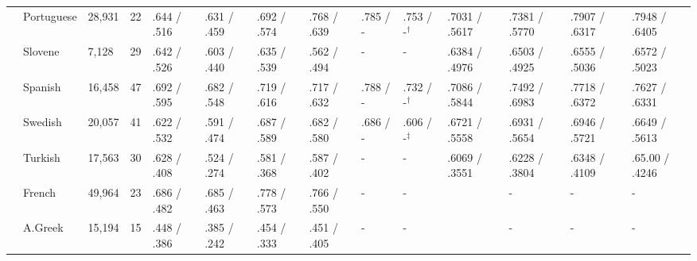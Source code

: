 \begin{landscape}
\begin{table}[ht]
\begin{flushleft}
\begin{tabular}{|l|l|l|l|p{1.5cm}|p{1.5cm}|p{1.5cm}|p{1.5cm}|p{1.5cm}|p{2cm}|p{2cm}|p{2cm}|p{2cm}|p{2cm}|}
        & Portuguese & 28,931  & 22   & .644 / .516   & .631 / .459   & .692 / .574   & .768 / .639   & .785 / -    & .753 / -$^\dagger$& .7031 / .5617 & .7381 / .5770  & .7907 / .6317     & .7948 / .6405 \\
        & Slovene    & 7,128   & 29   & .642 / .526   & .603 / .440   & .635 / .539   & .562 / .494   & -           & - & .6384 / .4976 & .6503 / .4925  & .6555 / .5036     & .6572 / .5023 \\
        & Spanish    & 16,458  & 47   & .692 / .595   & .682 / .548   & .719 / .616   & .717 / .632   & .788 / -    & .732 / -$^\dagger$& .7086 / .5844 & .7492 / .6983  & .7718 / .6372     & .7627 / .6331 \\
        & Swedish    & 20,057  & 41   & .622 / .532   & .591 / .474   & .687 / .589   & .682 / .580   & .686 / -    & .606 / -$^\ddagger$& .6721 / .5558 & .6931 / .5654  & .6946 / .5721     & .6649 / .5613 \\
        & Turkish    & 17,563  & 30   & .628 / .408   & .524 / .274   & .581 / .368   & .587 / .402   & -           & - & .6069 / .3551 & .6228 / .3804  & .6348 / .4109    & .65.00 / .4246 \\ \hline %
        & French     & 49,964  & 23   & .686 / .482   & .685 / .463   & .778 / .573   & .766 / .550   & -           & - & & - & -               & -        \\
        & A.Greek    & 15,194  & 15   & .448 / .386   & .385 / .242   & .454 / .333  & .451 / .405    & -           & - & & - & -               & -        \\ \hline
    \end{tabular}
  \end{flushleft}
\end{table}
\end{landscape}


